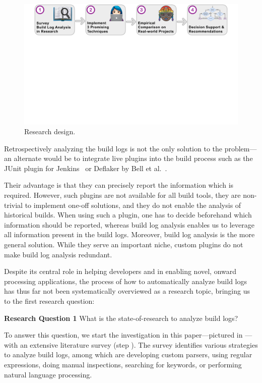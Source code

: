 \documentclass[10pt,journal,compsoc]{IEEEtran}
\newcommand\circlenum[1]{\raisebox{1.2pt}{\textcircled{\hspace{0.35pt}\scriptsize{\raisebox{-.4pt}{#1}}}}}
\begin{document}
\begin{figure}[htb]
	\centering
	\includegraphics[width=\textwidth, trim={1.2cm 10.5cm 1.2cm 0cm},
	clip]{img/overview.pdf}
	\caption{Research design.}
	\label{fig:overview}
\end{figure}

Retrospectively analyzing the build logs is not the only solution to
the problem---an alternate would be to integrate live plugins into the
build process
 such as the JUnit
plugin for Jenkins~\cite{jenkins2020junit-plugin} or
Deflaker by Bell et al.~\cite{bell2018deflaker}.

Their advantage is that they can precisely report the information which
is required.
However, such plugins are not available for all build tools, they are
non-trivial to implement one-off solutions, and they
do not enable the analysis of historical builds.
When using such a plugin, one has to decide
beforehand which information should be reported, whereas
build log analysis enables us to leverage all information
present in the build logs.
Moreover, build log analysis is the more general solution.
While they serve an important niche, custom plugins do not make build
log analysis redundant.

Despite its central role in helping developers and in enabling
novel, onward processing applications,
the process of how to
automatically
analyze build logs has thus far not been systematically
overviewed as a research topic, bringing us to the first
research question:
\begin{simplebox}[minipage boxed title*=-5cm]{\textbf{Research Question
1}}
What is the state-of-research to analyze build logs?
\end{simplebox}

To answer this question, we start the investigation in this
paper---pictured in
---with an
extensive literature survey (step \circlenum{1}).
The survey identifies various strategies to
analyze build logs, among which are developing
custom parsers, using regular expressions, doing manual inspections,
searching for keywords, or performing natural language processing.
\end{document}
